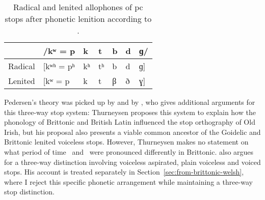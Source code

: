 \begin{table}[h]
  \centering
  \caption{Radical and lenited allophones of \gls{pc} stops after phonetic lenition according to \textcite[§§~149,~303]{Ped_Vergleichende09}.}
  \label{tab:pedersenstops}
  \begin{tabular}{lllllll}
    \toprule
    &/kʷ = p & k & t & b & d & ɡ/ \\\midrule
    Radical &[kʷʰ = pʰ& kʰ& tʰ& b & d & ɡ] \\ 
    Lenited &[kʷ = p & k & t & β & ð & ɣ]\\
    \bottomrule
  \end{tabular}
\end{table}


Pedersen's theory was picked up by \textcite[§~245]{Bau_Grammar24} and by \textcite[§~915]{Thu_grammar46}, who gives additional arguments for this three-way stop system:
Thurneysen proposes this system  to explain how the phonology of Brittonic and British Latin influenced the stop orthography of Old Irish, but his proposal also presents  a viable common ancestor of the Goidelic and Brittonic lenited voiceless stops. However, Thurneysen makes no statement on what period of time  \lT\ and \xD\ were pronounced differently in Brittonic. \Textcite{koch_*cothairche_1990} also argues for a three-way distinction involving voiceless aspirated, plain voiceless and voiced stops. His account is treated separately in Section~\ref{sec:from-brittonic-welsh}, where I reject this specific phonetic arrangement while maintaining a three-way stop distinction.


